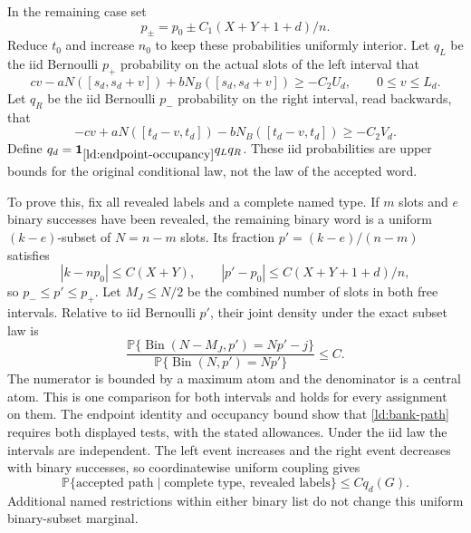 In the remaining case set
\[
 p_\pm=p_0\pm C_1(X+Y+1+d)/n.
\]
Reduce \(t_0\) and increase \(n_0\) to keep these probabilities
uniformly interior.  Let \(q_L\) be the iid Bernoulli \(p_+\)
probability on the actual slots of the left interval that
\[
 cv-aN([s_d,s_d+v])+bN_B([s_d,s_d+v])\ge-C_2U_d,
       \qquad 0\le v\le L_d.
\]
Let \(q_R\) be the iid Bernoulli \(p_-\) probability on the right
interval, read backwards, that
\[
 -cv+aN([t_d-v,t_d])-bN_B([t_d-v,t_d])\ge-C_2V_d.
\]
Define \(q_d=\mathbf1_{\eqref{ld:endpoint-occupancy}}q_Lq_R\).
These iid probabilities are upper bounds for the original conditional
law, not the law of the accepted word.

To prove this, fix all revealed labels and a complete named type.
If \(m\) slots and \(e\) binary successes have been revealed, the
remaining binary word is a uniform \((k-e)\)-subset of \(N=n-m\)
slots.  Its fraction \(p'=(k-e)/(n-m)\) satisfies
\[
 |k-np_0|\le C(X+Y),\qquad
 |p'-p_0|\le C(X+Y+1+d)/n,
\]
so \(p_-\le p'\le p_+\).  Let \(M_J\le N/2\) be the combined
number of slots in both free intervals.  Relative to iid Bernoulli
\(p'\), their joint density under the exact subset law is
\begin{equation}
 \frac{\mathbb P\{\operatorname{Bin}(N-M_J,p')=Np'-j\}}
 {\mathbb P\{\operatorname{Bin}(N,p')=Np'\}}\le C.
 \label{ld:joint-subset-density}
\end{equation}
The numerator is bounded by a maximum atom and the denominator is a
central atom.  This is one comparison for both intervals and holds
for every assignment on them.  The endpoint identity and occupancy
bound show that \eqref{ld:bank-path} requires both displayed tests,
with the stated allowances.  Under the iid law the intervals are
independent.  The left event increases and the right event decreases
with binary successes, so coordinatewise uniform coupling gives
\begin{equation}
 \mathbb P\{\text{accepted path}\mid
              \text{complete type, revealed labels}\}\le Cq_d(G).
 \label{ld:type-bank-upper}
\end{equation}
Additional named restrictions within either binary list do not change
this uniform binary-subset marginal.

